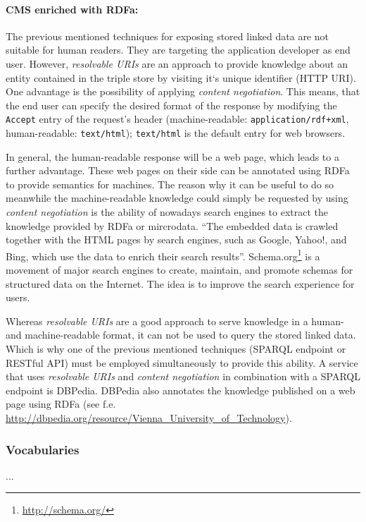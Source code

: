 \documentclass{article}
\begin{document}
\paragraph{CMS enriched with RDFa:} The previous mentioned techniques for exposing stored linked data are not suitable for human readers. They are targeting the application developer as end user. However,  \textit{resolvable URIs} are an approach to provide knowledge about an entity contained in the triple store by visiting it`s unique identifier (HTTP URI). One advantage is the possibility of applying \textit{content negotiation}. This means, that the end user can specify the desired format of the response by modifying the \texttt{Accept} entry of the request's header (machine-readable: \texttt{application/rdf+xml}, human-readable: \texttt{text/html}); \texttt{text/html} is the default entry for web browsers.

In general, the human-readable response will be a web page, which leads to a further advantage. These web pages on their side can be annotated using RDFa to provide semantics for machines. The reason why it can be useful to do so meanwhile the machine-readable knowledge could simply be requested by using \textit{content negotiation} is the ability of nowadays search engines to extract the knowledge provided by RDFa or mircrodata. \enquote{The embedded data is crawled together with the HTML pages by search engines, such as Google, Yahoo!, and Bing, which use the data to enrich their search results}\cite{bizer_deployment_2013}. Schema.org\footnote{\url{http://schema.org/}} is a movement of major search engines to create, maintain, and promote schemas for structured data on the Internet. The idea is to improve the search experience for users.

Whereas \textit{resolvable URIs} are a good approach to serve knowledge in a human- and machine-readable format, it can not be used to query the stored linked data. Which is why one of the previous mentioned techniques (SPARQL endpoint or RESTful API) must be employed simultaneously to provide this ability. A service that uses \textit{resolvable URIs} and \textit{content negotiation} in combination with a SPARQL endpoint is DBPedia. DBPedia also annotates the knowledge published on a web page using RDFa (see f.e. \url{http://dbpedia.org/resource/Vienna_University_of_Technology}).

\subsubsection{Vocabularies}
\label{technical-architecture-challenges:proposal:vocabulary}
...
\end{document}
